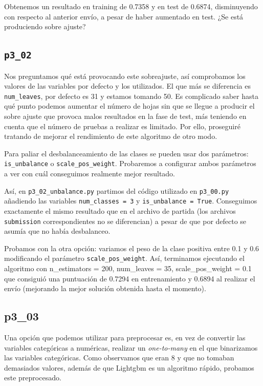 \documentclass[a4paper, 20pt]{article}
\begin{document}
Obtenemos un resultado en training de 0.7358 y en test de 0.6874, disminuyendo con respecto al anterior envío, a pesar de haber aumentado en test. ¿Se está produciendo sobre ajuste?

\subsection{\texttt{p3\_02}}

Nos preguntamos qué está provocando este sobreajuste, así comprobamos los valores de las variables por defecto y los utilizados. El que más se diferencia es \texttt{num\_leaves}, por defecto es 31 y estamos tomando 50. Es complicado saber hasta qué punto podemos aumentar el número de hojas sin que se llegue a producir el sobre ajuste que provoca malos resultados en la fase de test, más teniendo en cuenta que el número de pruebas a realizar es limitado. Por ello, proseguiré tratando de mejorar el rendimiento de este algoritmo de otro modo.

Para paliar el desbalanceamiento de las clases se pueden usar dos parámetros: \texttt{is\_unbalance} o \texttt{scale\_pos\_weight}.
Probaremos a configurar ambos parámetros a ver con cuál conseguimos realmente mejor resultado.

Así, en \texttt{p3\_02\_unbalance.py} partimos del código utilizado en \texttt{p3\_00.py} añadiendo las variables \texttt{num\_classes = 3} y \texttt{is\_unbalance = True}. Conseguimos exactamente el mismo resultado que en el archivo de partida (los archivos \texttt{submission} correspondientes no se diferencian) a pesar de que por defecto se asumía que no había desbalanceo. 

Probamos con la otra opción: variamos el peso de la clase positiva entre 0.1 y 0.6 modificando el parámetro \texttt{scale\_pos\_weight}.
Así, terminamos ejecutando el algoritmo con {\ttfamily n\_estimators = 200, num\_leaves = 35, scale\_pos\_weight = 0.1} que consiguió una puntuación de 0.7294 en entrenamiento y 0.6894 al realizar el envío (mejorando la mejor solución obtenida hasta el momento).

\subsection{p3\_03}
Una opción que podemos utilizar para preprocesar es, en vez de convertir las variables categóricas a numéricas, realizar un \textit{one-to-many} en el que binarizamos las variables categóricas. Como observamos que eran 8 y que no tomaban demasiados valores, además de que Lightgbm es un algoritmo rápido, probamos este preprocesado. 
\end{document}
